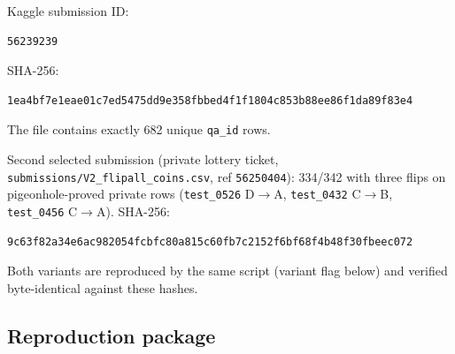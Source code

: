 \documentclass[12pt,a4paper]{article}
\begin{document}
Kaggle submission ID:

\begin{verbatim}
56239239
\end{verbatim}

SHA-256:

\begin{verbatim}
1ea4bf7e1eae01c7ed5475dd9e358fbbed4f1f1804c853b88ee86f1da89f83e4
\end{verbatim}

The file contains exactly 682 unique \texttt{qa\_id} rows.

Second selected submission (private lottery ticket,
\texttt{submissions/V2\_flipall\_coins.csv}, ref \texttt{56250404}):
334/342 with three flips on pigeonhole-proved private rows
(\texttt{test\_0526} D$\rightarrow$A, \texttt{test\_0432} C$\rightarrow$B,
\texttt{test\_0456} C$\rightarrow$A). SHA-256:

\begin{verbatim}
9c63f82a34e6ac982054fcbfc80a815c60fb7c2152f6bf68f4b48f30fbeec072
\end{verbatim}

Both variants are reproduced by the same script (variant flag below) and
verified byte-identical against these hashes.

\subsection{Reproduction package}
\end{document}
